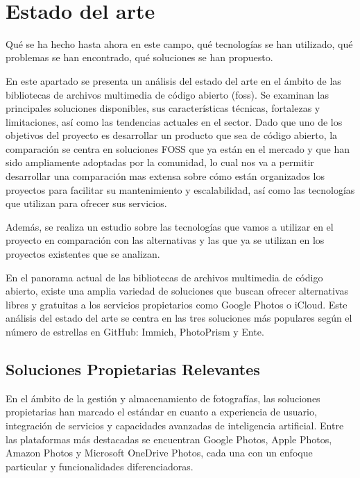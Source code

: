 \newpage
~
\newpage
\section{Estado del arte}
Qué se ha hecho hasta ahora en este campo, qué tecnologías se han utilizado, qué problemas se han encontrado, qué soluciones se han propuesto.

En este apartado se presenta un análisis del estado del arte en el ámbito de las bibliotecas de archivos multimedia de código abierto (\acrshort{foss}).
Se examinan las principales soluciones disponibles, sus características técnicas, fortalezas y limitaciones, así como las tendencias actuales en el sector.
Dado que uno de los objetivos del proyecto es desarrollar un producto que sea de código abierto, la comparación se centra en soluciones FOSS que ya están en el mercado y que han sido ampliamente adoptadas por la comunidad, lo cual nos va a permitir desarrollar una comparación mas extensa sobre cómo están organizados los proyectos para facilitar su mantenimiento y escalabilidad, así como las tecnologías que utilizan para ofrecer sus servicios.

Además, se realiza un estudio sobre las tecnologías que vamos a utilizar en el proyecto en comparación con las alternativas y las que ya se utilizan en los proyectos existentes que se analizan.

En el panorama actual de las bibliotecas de archivos multimedia de código abierto, existe una amplia variedad de soluciones que buscan ofrecer alternativas libres y gratuitas a los servicios propietarios como Google Photos o iCloud. Este análisis del estado del arte se centra en las tres soluciones más populares según el número de estrellas en GitHub: Immich, PhotoPrism y Ente.

\subsection{Soluciones Propietarias Relevantes}

En el ámbito de la gestión y almacenamiento de fotografías, las soluciones propietarias han marcado el estándar en cuanto a experiencia de usuario, integración de servicios y capacidades avanzadas de inteligencia artificial. Entre las plataformas más destacadas se encuentran Google Photos, Apple Photos, Amazon Photos y Microsoft OneDrive Photos, cada una con un enfoque particular y funcionalidades diferenciadoras.

